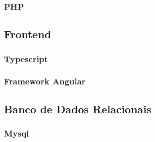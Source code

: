 \subsubsection{PHP}
\subsection{Frontend}
\subsubsection{Typescript}
\subsubsection{Framework Angular}
\subsection{Banco de Dados Relacionais}
\subsubsection{Mysql}